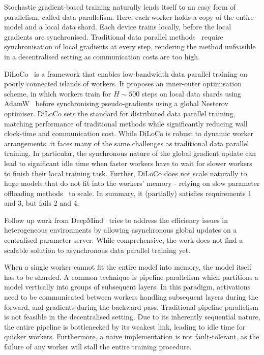 \documentclass[conference, 10pt]{IEEEtran}
\begin{document}
Stochastic gradient-based training naturally lends itself to an easy form of
parallelism, called data parallelism. Here, each worker holds a copy of the
entire model and a local data shard. Each device trains locally, before the local
gradients are synchronised. Traditional data parallel methods~\cite{mcmahan2016}
require synchronisation of local gradients at every step, rendering the method
unfeasible in a decentralised setting as communication costs are too high.

DiLoCo~\cite{douillard2023} is a framework that enables low-bandwidth data
parallel training on poorly connected islands of workers. It proposes an
inner-outer optimisation scheme, in which workers train for $H\sim 500$ steps on
local data shards using AdamW~\cite{loshchilov2019} before synchronising
pseudo-gradients using a global Nesterov optimiser. DiLoCo sets the standard for
distributed data parallel training, matching performance of traditional methods
while significantly reducing wall clock-time and communication cost. While
DiLoCo is robust to dynamic worker arrangements, it faces many of the same
challenges as traditional data parallel training. In particular, the synchronous
nature of the global gradient update can lead to significant idle time when
faster workers have to wait for slower workers to finish their local training
task. Further, DiLoCo does not scale naturally to huge models that do not fit
into the workers' memory - relying on slow parameter offloading
methods~\cite{rhu2016, cui2016} to scale. In summary, it (partially) satisfies
requirements 1 and 3, but fails 2 and 4.

Follow up work from DeepMind~\cite{li2024} tries to address the efficiency
issues in heterogeneous environments by allowing asynchronous global updates on
a centralised parameter server. While comprehensive, the work does not find a
scalable solution to asynchronous data parallel training yet.


When a single worker cannot fit the entire model into memory, the model itself
has to be sharded. A common technique is pipeline parallelism which partitions a
model vertically into groups of subsequent layers. In this paradigm, activations
need to be communicated between workers handling subsequent layers during the
forward, and gradients during the backward pass. Traditional pipeline
parallelism is not feasible in the decentralised setting. Due to its inherently
sequential nature, the entire pipeline is bottlenecked by its weakest link,
leading to idle time for quicker workers. Furthermore, a naive implementation is
not fault-tolerant, as the failure of any worker will stall the entire training
procedure.
\end{document}
